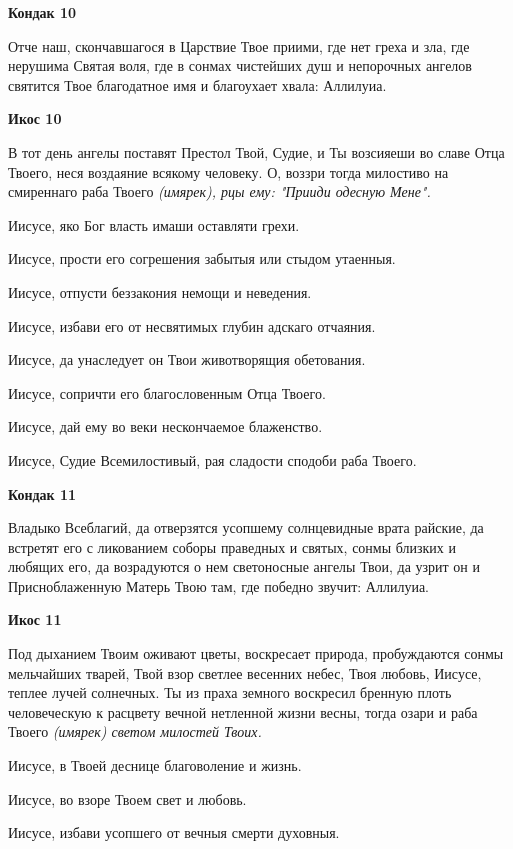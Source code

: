 \bfseries Кондак 10\normalfont{}


Отче наш, скончавшагося в Царствие Твое приими, где нет греха и зла, где нерушима Святая воля, где в сонмах чистейших душ и непорочных ангелов святится Твое благодатное имя и благоухает хвала: Аллилуиа.




\bfseries Икос 10\normalfont{}


В тот день ангелы поставят Престол Твой, Судие, и Ты возсияеши во славе Отца Твоего, неся воздаяние всякому человеку. О, воззри тогда милостиво на смиреннаго раба Твоего \itshape (имярек)\normalfont{}, рцы ему: "Прииди одесную Мене". 


Иисусе, яко Бог власть имаши оставляти грехи. 


Иисусе, прости его согрешения забытыя или стыдом утаенныя. 


Иисусе, отпусти беззакония немощи и неведения. 


Иисусе, избави его от несвятимых глубин адскаго отчаяния. 


Иисусе, да унаследует он Твои животворящия обетования. 


Иисусе, сопричти его благословенным Отца Твоего. 


Иисусе, дай ему во веки нескончаемое блаженство. 


Иисусе, Судие Всемилостивый, рая сладости сподоби раба Твоего.




\bfseries Кондак 11\normalfont{}


Владыко Всеблагий, да отверзятся усопшему солнцевидные врата райские, да встретят его с ликованием соборы праведных и святых, сонмы близких и любящих его, да возрадуются о нем светоносные ангелы Твои, да узрит он и Присноблаженную Матерь Твою там, где победно звучит: Аллилуиа.




\bfseries Икос 11\normalfont{}


Под дыханием Твоим оживают цветы, воскресает природа, пробуждаются сонмы мельчайших тварей, Твой взор светлее весенних небес, Твоя любовь, Иисусе, теплее лучей солнечных. Ты из праха земного воскресил бренную плоть человеческую к расцвету вечной нетленной жизни весны, тогда озари и раба Твоего \itshape (имярек)\normalfont{} светом милостей Твоих. 


Иисусе, в Твоей деснице благоволение и жизнь. 


Иисусе, во взоре Твоем свет и любовь. 


Иисусе, избави усопшего от вечныя смерти духовныя. 


